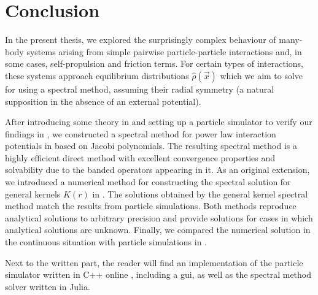 \chapter{Conclusion}
\label{chap:conclusion}



In the present thesis, we explored the surprisingly complex behaviour of many-body systems arising from simple pairwise particle-particle interactions and, in some cases, self-propulsion and friction terms.
For certain types of interactions, these systems approach equilibrium distributions $\hat{\rho}(\vec{x})$ which we aim to solve for using a spectral method, assuming their radial symmetry (a natural supposition in the absence of an external potential).

After introducing some theory in  and setting up a particle simulator to verify our findings in , we constructed a spectral method for power law interaction potentials in  based on Jacobi polynomials.
The resulting spectral method is a highly efficient direct method with excellent convergence properties and solvability due to the banded operators appearing in it.
As an original extension, we introduced a numerical method for constructing the spectral solution for general kernels $K(r)$ in .
The solutions obtained by the general kernel spectral method match the results from particle simulations.
Both methods reproduce analytical solutions to arbitrary precision and provide solutions for cases in which analytical solutions are unknown.
Finally, we compared the numerical solution in the continuous situation with particle simulations in .

Next to the written part, the reader will find an implementation of the particle simulator written in C++ online \parencite{2023-my-dissertation}, including a \gls{gui}, as well as the spectral method solver written in Julia.


